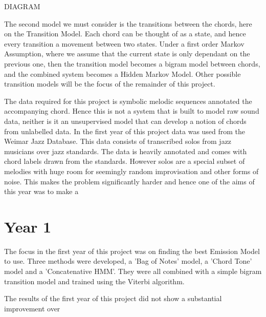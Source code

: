 \documentclass[bsc,frontabs,twoside,singlespacing,parskip,deptreport]{infthesis}
\begin{document}
DIAGRAM

The second model we must consider is the transitions between the chords, here on the Transition Model. Each chord can be thought of as a state, and hence every transition a movement between two states. Under a first order Markov Assumption, where we assume that the current state is only dependant on the previous one, then the transition model becomes a bigram model between chords, and the combined system becomes a Hidden Markov Model. Other possible transition models will be the focus of the remainder of this project. 

The data required for this project is symbolic melodic sequences annotated the accompanying chord. Hence this is not a system that is built to model raw sound data, neither is it an unsupervised model that can develop a notion of chords from unlabelled data. In the first year of this project data was used from the Weimar Jazz Database. This data consists of transcribed solos from jazz musicians over jazz standards. The data is heavily annotated and comes with chord labels drawn from the standards. However solos are a special subset of melodies with huge room for seemingly random improvisation and other forms of noise. This makes the problem significantly harder and hence one of the aims of this year was to make a 

\chapter{Year 1}

The focus in the first year of this project was on finding the best Emission Model to use. Three methods were developed, a 'Bag of Notes' model, a 'Chord Tone' model and a 'Concatenative HMM'. They were all combined with a simple bigram transition model and trained using the Viterbi algorithm.

The results of the first year of this project did not show a substantial improvement over



\end{document}
